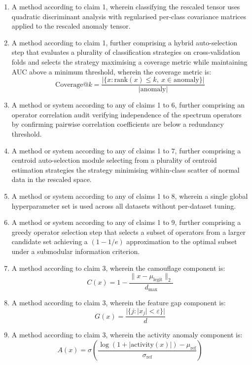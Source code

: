 \documentclass[12pt,a4paper]{article}
\begin{document}
\begin{enumerate}[label=\textbf{\arabic*.}]
\item A method according to claim 1, wherein classifying the rescaled tensor
uses quadratic discriminant analysis with regularised per-class covariance
matrices applied to the rescaled anomaly tensor.

\item A method according to claim 1, further comprising a hybrid
auto-selection step that evaluates a plurality of classification strategies
on cross-validation folds and selects the strategy maximising a coverage
metric while maintaining AUC above a minimum threshold, wherein the coverage
metric is:
\[
\mathrm{Coverage@}k = \frac{|\{x : \mathrm{rank}(x)\leq k,\
x\in\mathrm{anomaly}\}|}{|\mathrm{anomaly}|}
\]

\item A method or system according to any of claims 1 to 6, further
comprising an operator correlation audit verifying independence of the
spectrum operators by confirming pairwise correlation coefficients are
below a redundancy threshold.

\item A method or system according to any of claims 1 to 7, further
comprising a centroid auto-selection module selecting from a plurality of
centroid estimation strategies the strategy minimising within-class scatter
of normal data in the rescaled space.

\item A method or system according to any of claims 1 to 8, wherein a
single global hyperparameter set is used across all datasets without
per-dataset tuning.

\item A method or system according to any of claims 1 to 9, further
comprising a greedy operator selection step that selects a subset of
operators from a larger candidate set achieving a $(1-1/e)$ approximation
to the optimal subset under a submodular information criterion.

\item A method according to claim 3, wherein the camouflage component is:
\[
C(x) = 1 - \frac{\|x-\mu_{\mathrm{legit}}\|_2}{d_{\max}}
\]
\item A method according to claim 3, wherein the feature gap component is:
\[
G(x) = \frac{|\{j : |x_j|<\varepsilon\}|}{d}
\]
\item A method according to claim 3, wherein the activity anomaly component is:
\[
A(x) = \sigma\!\left(\frac{\log(1+|\mathrm{activity}(x)|)-\mu_{\mathrm{ref}}}
{\sigma_{\mathrm{ref}}}\right)
\]


\end{enumerate}
\end{document}
